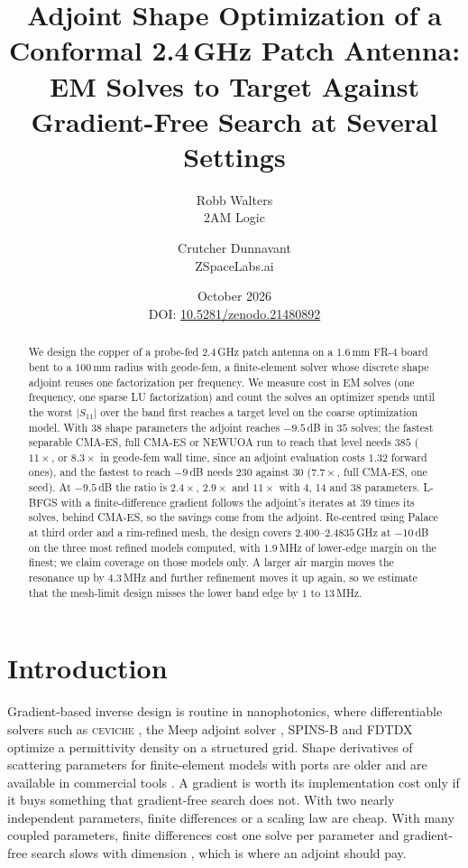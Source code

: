 \documentclass{anvil-paper}
\title{Adjoint Shape Optimization of a Conformal 2.4\,GHz Patch Antenna:
EM Solves to Target Against Gradient-Free Search at Several Settings}
\author{Robb Walters\\
  {\normalsize 2AM Logic}
  \and Crutcher Dunnavant\\
  {\normalsize ZSpaceLabs.ai}}
\date{October 2026\\[0.5ex]
  {\normalsize DOI: \href{https://doi.org/10.5281/zenodo.21480892}{10.5281/zenodo.21480892}}}
\begin{document}
\maketitle

\begin{abstract}
We design the copper of a probe-fed 2.4\,GHz patch antenna on a $1.6$\,mm
FR-4 board bent to a $100$\,mm radius with geode-fem, a finite-element
solver whose discrete shape adjoint reuses one factorization per frequency.
We measure cost in EM solves (one frequency, one sparse LU factorization) and
count the solves an optimizer spends until the worst $|S_{11}|$ over the band
first reaches a target level on the coarse optimization model. With
38 shape parameters the adjoint reaches $-9.5$\,dB in $35$ solves; the fastest
separable CMA-ES, full CMA-ES or NEWUOA run to reach that level needs $385$
($11\times$, or $8.3\times$ in geode-fem wall time, since an adjoint
evaluation costs $1.32$ forward ones), and the fastest to reach $-9$\,dB needs
$230$ against $30$ ($7.7\times$, full CMA-ES, one seed). At $-9.5$\,dB the
ratio is $2.4\times$, $2.9\times$ and $11\times$ with 4, 14 and 38 parameters.
L-BFGS with a finite-difference gradient follows the adjoint's iterates at
$39$ times its solves, behind CMA-ES, so the savings come from the adjoint.
Re-centred using Palace at third order and a rim-refined mesh, the design
covers $2.400$--$2.4835$\,GHz at $-10$\,dB on the three most refined models
computed, with $1.9$\,MHz of lower-edge margin on the finest; we claim
coverage on those models only. A larger air margin moves the resonance up by
$4.3$\,MHz and further refinement moves it up again, so we estimate that the
mesh-limit design misses the lower band edge by $1$ to $13$\,MHz.
\end{abstract}

\section{Introduction}
\label{sec:intro}

Gradient-based inverse design is routine in nanophotonics, where
differentiable solvers such as \textsc{ceviche} \citep{hughes2019forward},
the Meep adjoint solver \citep{hammond2022meepadjoint}, SPINS-B
\citep{su_spinsb} and FDTDX \citep{mahlau2026fdtdx} optimize a permittivity
density on a structured grid. Shape derivatives of scattering parameters for
finite-element models with ports are older
\citep{webb2000design,georgieva2002feasible,nikolova2004adjoint} and are
available in commercial tools
\citep{ansys_hfss_derivatives,comsol_sensitivity_method}. A gradient is worth
its implementation cost only if it buys something that gradient-free search
does not. With two nearly independent parameters, finite differences or a
scaling law are cheap. With many coupled parameters, finite differences cost
one solve per parameter and gradient-free search slows with dimension
\citep{rios2013derivative}, which is where an adjoint should pay.
\end{document}
